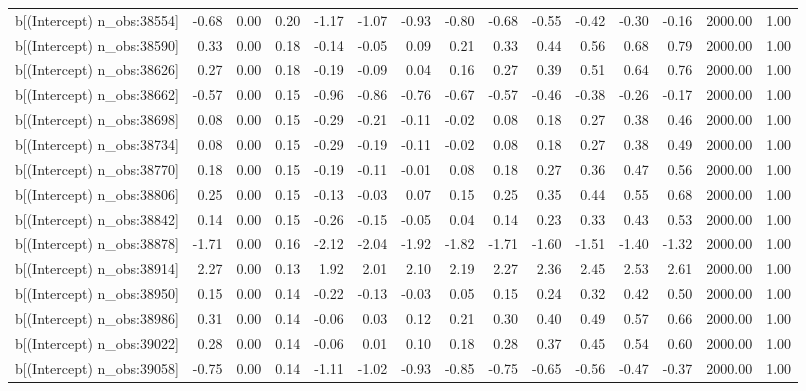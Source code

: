 \begin{table}[ht]
\begin{tabular}{rrrrrrrrrrrrrrr}
  b[(Intercept) n\_obs:38554] & -0.68 & 0.00 & 0.20 & -1.17 & -1.07 & -0.93 & -0.80 & -0.68 & -0.55 & -0.42 & -0.30 & -0.16 & 2000.00 & 1.00 \\ 
  b[(Intercept) n\_obs:38590] & 0.33 & 0.00 & 0.18 & -0.14 & -0.05 & 0.09 & 0.21 & 0.33 & 0.44 & 0.56 & 0.68 & 0.79 & 2000.00 & 1.00 \\ 
  b[(Intercept) n\_obs:38626] & 0.27 & 0.00 & 0.18 & -0.19 & -0.09 & 0.04 & 0.16 & 0.27 & 0.39 & 0.51 & 0.64 & 0.76 & 2000.00 & 1.00 \\ 
  b[(Intercept) n\_obs:38662] & -0.57 & 0.00 & 0.15 & -0.96 & -0.86 & -0.76 & -0.67 & -0.57 & -0.46 & -0.38 & -0.26 & -0.17 & 2000.00 & 1.00 \\ 
  b[(Intercept) n\_obs:38698] & 0.08 & 0.00 & 0.15 & -0.29 & -0.21 & -0.11 & -0.02 & 0.08 & 0.18 & 0.27 & 0.38 & 0.46 & 2000.00 & 1.00 \\ 
  b[(Intercept) n\_obs:38734] & 0.08 & 0.00 & 0.15 & -0.29 & -0.19 & -0.11 & -0.02 & 0.08 & 0.18 & 0.27 & 0.38 & 0.49 & 2000.00 & 1.00 \\ 
  b[(Intercept) n\_obs:38770] & 0.18 & 0.00 & 0.15 & -0.19 & -0.11 & -0.01 & 0.08 & 0.18 & 0.27 & 0.36 & 0.47 & 0.56 & 2000.00 & 1.00 \\ 
  b[(Intercept) n\_obs:38806] & 0.25 & 0.00 & 0.15 & -0.13 & -0.03 & 0.07 & 0.15 & 0.25 & 0.35 & 0.44 & 0.55 & 0.68 & 2000.00 & 1.00 \\ 
  b[(Intercept) n\_obs:38842] & 0.14 & 0.00 & 0.15 & -0.26 & -0.15 & -0.05 & 0.04 & 0.14 & 0.23 & 0.33 & 0.43 & 0.53 & 2000.00 & 1.00 \\ 
  b[(Intercept) n\_obs:38878] & -1.71 & 0.00 & 0.16 & -2.12 & -2.04 & -1.92 & -1.82 & -1.71 & -1.60 & -1.51 & -1.40 & -1.32 & 2000.00 & 1.00 \\ 
  b[(Intercept) n\_obs:38914] & 2.27 & 0.00 & 0.13 & 1.92 & 2.01 & 2.10 & 2.19 & 2.27 & 2.36 & 2.45 & 2.53 & 2.61 & 2000.00 & 1.00 \\ 
  b[(Intercept) n\_obs:38950] & 0.15 & 0.00 & 0.14 & -0.22 & -0.13 & -0.03 & 0.05 & 0.15 & 0.24 & 0.32 & 0.42 & 0.50 & 2000.00 & 1.00 \\ 
  b[(Intercept) n\_obs:38986] & 0.31 & 0.00 & 0.14 & -0.06 & 0.03 & 0.12 & 0.21 & 0.30 & 0.40 & 0.49 & 0.57 & 0.66 & 2000.00 & 1.00 \\ 
  b[(Intercept) n\_obs:39022] & 0.28 & 0.00 & 0.14 & -0.06 & 0.01 & 0.10 & 0.18 & 0.28 & 0.37 & 0.45 & 0.54 & 0.60 & 2000.00 & 1.00 \\ 
  b[(Intercept) n\_obs:39058] & -0.75 & 0.00 & 0.14 & -1.11 & -1.02 & -0.93 & -0.85 & -0.75 & -0.65 & -0.56 & -0.47 & -0.37 & 2000.00 & 1.00 \\ 

\end{tabular}
\end{table}
